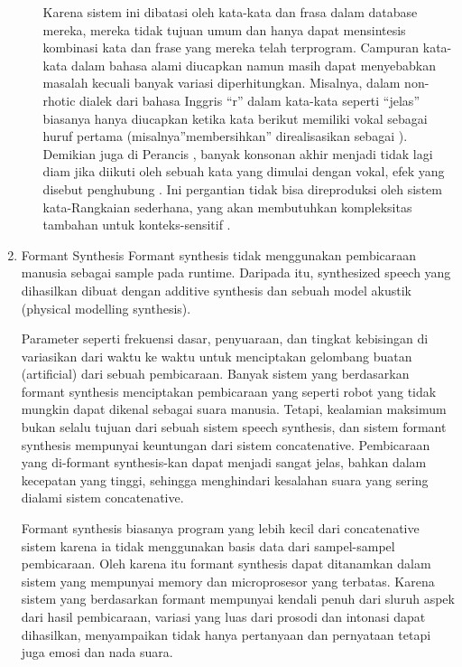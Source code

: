 \begin{enumerate}
\begin{enumerate}
Karena sistem ini dibatasi oleh kata-kata dan frasa dalam database mereka, mereka tidak tujuan umum dan hanya dapat mensintesis kombinasi kata dan frase yang mereka telah terprogram. Campuran kata-kata dalam bahasa alami diucapkan namun masih dapat menyebabkan masalah kecuali banyak variasi diperhitungkan. Misalnya, dalam non-rhotic dialek dari bahasa Inggris “r” dalam kata-kata seperti “jelas” biasanya hanya diucapkan ketika kata berikut memiliki vokal sebagai huruf pertama (misalnya”membersihkan” direalisasikan sebagai  ). Demikian juga di Perancis , banyak konsonan akhir menjadi tidak lagi diam jika diikuti oleh sebuah kata yang dimulai dengan vokal, efek yang disebut penghubung . Ini pergantian tidak bisa direproduksi oleh sistem kata-Rangkaian sederhana, yang akan membutuhkan kompleksitas tambahan untuk konteks-sensitif .
\end{enumerate}
\item Formant Synthesis
Formant synthesis tidak menggunakan pembicaraan manusia sebagai sample pada runtime. Daripada itu, synthesized speech yang dihasilkan dibuat dengan additive synthesis dan sebuah model akustik (physical modelling synthesis).

Parameter seperti frekuensi dasar, penyuaraan, dan tingkat kebisingan di variasikan dari waktu ke waktu untuk menciptakan gelombang buatan (artificial) dari sebuah pembicaraan. Banyak sistem yang berdasarkan formant synthesis menciptakan pembicaraan yang seperti robot yang tidak mungkin dapat dikenal sebagai suara manusia. Tetapi, kealamian maksimum bukan selalu tujuan dari sebuah sistem speech synthesis, dan sistem formant synthesis mempunyai keuntungan dari sistem concatenative. Pembicaraan yang di-formant synthesis-kan dapat menjadi sangat jelas, bahkan dalam kecepatan yang tinggi, sehingga menghindari kesalahan suara yang sering dialami sistem concatenative.

Formant synthesis biasanya program yang lebih kecil dari concatenative sistem karena ia tidak menggunakan basis data dari sampel-sampel pembicaraan. Oleh karena itu formant synthesis dapat ditanamkan dalam sistem yang mempunyai memory dan microprosesor yang terbatas. Karena sistem yang berdasarkan formant mempunyai kendali penuh dari sluruh aspek dari hasil pembicaraan, variasi yang luas dari prosodi dan intonasi dapat dihasilkan, menyampaikan tidak hanya pertanyaan dan pernyataan tetapi juga emosi dan nada suara.


\end{enumerate}
